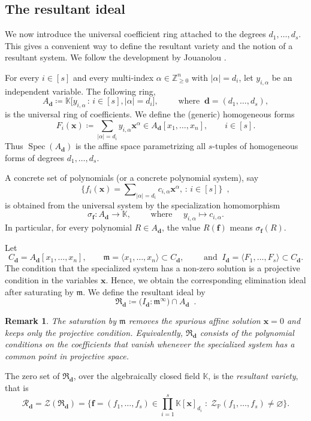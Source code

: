 \documentclass[11pt,a4paper]{article}
\newcommand{\ideal}[1]{\langle #1 \rangle}
\newtheorem{remark}[theorem]{Remark}\AddToHook{env/remark/begin}{\crefalias{theorem}{remark}}
\numberwithin{equation}{section}
\newcommand{\PP}{\mathbb{P}}
\newcommand{\NN}{\mathbb{Z}_{\geq 0}}
\newcommand{\KK}{\mathbb{K}}
\newcommand{\cZ}{\mathcal{Z}}
\newcommand{\xx}{\ensuremath{\boldsymbol{x}}}
\newcommand{\ff}{\ensuremath{\boldsymbol{f}}}
\newcommand{\dd}{\mathbf{d}}
\DeclareMathOperator{\Spec}{Spec}
\begin{document}
\subsection{The resultant ideal}
\label{sec:resultant-ideal}


We now introduce the universal coefficient ring attached to the degrees
$d_1,\ldots,d_s$. This gives a convenient way to define the resultant variety
and the notion of a resultant system.
We follow the development by Jouanolou \cite{Jouanolou-80,Jouanolou-91}.

For every $i\in [s]$ and every multi-index $\alpha \in\NN^n$ with
$|\alpha|=d_i$, let $y_{i,\alpha}$ be an independent variable.
The following ring, 
\[
	A_{\dd}
	\coloneqq
	\KK \big[y_{i,\alpha} \,:\, i\in [s] ,  |\alpha|=d_i\big],
	\qquad
	\text{ where } \ 
	\dd=(d_1,\ldots,d_s),
\]
is the universal ring of coefficients. 
We define the (generic) homogeneous forms
\[	
	F_i(\xx) \coloneqq
	\sum_{|\alpha|=d_i} y_{i,\alpha}\xx^\alpha
	\in A_{\dd}[x_1,\ldots,x_n],
	\qquad i \in [s].
\]
Thus $\Spec(A_{\dd})$ is the affine space parametrizing all
$s$-tuples of homogeneous forms of degrees $d_1,\ldots,d_s$.

A concrete set of polynomials (or a concrete polynomial system), 
say 
\[
	\Big\{ f_i(\xx)=\sum\nolimits_{|\alpha|=d_i} c_{i,\alpha}\xx^\alpha, \,:\,
		i \in [s] \Big\} \enspace,
\]
is obtained from the universal system by the specialization homomorphism
\[
	\sigma_{\ff} : A_{\dd}\longrightarrow \KK,
	\qquad \text{ where } \quad
	y_{i,\alpha}\longmapsto c_{i,\alpha}.
\]
In particular, for every polynomial $R\in A_{\dd}$, the value $R(\ff)$ means
$\sigma_{\ff}(R)$.

Let
\[
	C_{\dd}=A_{\dd}[x_1,\ldots,x_n],
	\qquad
	\mathfrak m= \ideal{x_1,\ldots,x_n} \subset C_{\dd},
	\qquad \text{ and } \ 
	I_{\dd}= \ideal{F_1,\ldots,F_s}\subset C_{\dd}.
\]
The condition that the specialized system has a non-zero solution is a projective
condition in the variables $\xx$. 
Hence, we obtain the corresponding elimination ideal
after saturating by $\mathfrak m$. We define the resultant ideal by
\[
	\mathfrak R_{\dd}
	\coloneqq
	\bigl(I_{\dd}:\mathfrak m^\infty\bigr)\cap A_{\dd}
	\enspace .
\]
\begin{remark}
The saturation by $\mathfrak m$ removes the spurious affine solution $\xx=0$ and keeps only the projective condition. Equivalently, $\mathfrak R_{\dd}$ consists of the polynomial conditions on the coefficients that vanish whenever the specialized system has a common point in projective space. 
\end{remark}
The zero set of $\mathfrak R_{\dd}$, over the algebraically 
closed field $\KK$,  is the \emph{resultant variety}, that is 
\[
\mathcal R_{\dd} =
	\cZ(\mathfrak R_{\dd}) =
\Big\{
	\ff=(f_1,\ldots,f_s)
	\in
	\prod_{i=1}^s \KK[\xx]_{d_i}
	\;:\;
	\cZ_{\PP}(f_1,\ldots,f_s)\neq \varnothing
\Big\}.
\]
\end{document}
